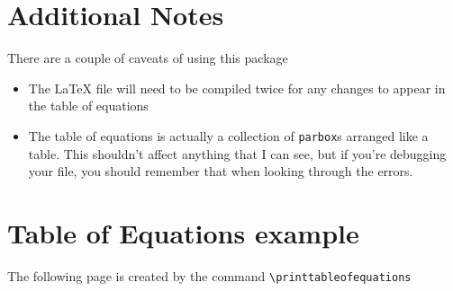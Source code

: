 \documentclass{article}
\begin{document}
\section{Additional Notes}
\label{sec:additional-notes}

There are a couple of caveats of using this package
\begin{itemize}
\item The LaTeX file will need to be compiled twice for any changes to appear in the table of equations
\item The table of equations is actually a collection of \verb=parbox=s arranged like a table. This shouldn't affect anything that I can see, but if you're debugging your file, you should remember that when looking through the errors.
\end{itemize}

\appendix

\section{Table of Equations example}
\label{sec:table-equat-example}
The following page is created by the command \verb=\printtableofequations=
\printtableofequations
\end{document}
